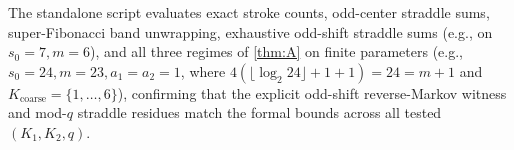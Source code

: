 \begin{remark}\label{rem:dnp-numerics}
The standalone script  evaluates exact stroke counts, odd-center straddle sums,
super-Fibonacci band unwrapping, exhaustive odd-shift straddle sums (e.g., on $s_0 = 7, m = 6$), and all three regimes of
\cref{thm:A} on finite parameters (e.g., $s_0 = 24, m = 23, a_1 = a_2 = 1$, where $4(\lfloor\log_2 24\rfloor + 1 + 1) =
24 = m + 1$ and $K_{\mathrm{coarse}} = \{1, \dots, 6\}$), confirming that the explicit odd-shift reverse-Markov witness
and mod-$q$ straddle residues match the formal bounds across all tested $(K_1, K_2, q)$.
\end{remark}
